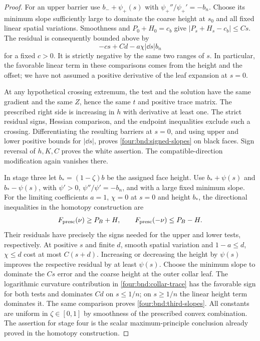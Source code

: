 \begin{proof}
For an upper barrier use $b_-+\psi_+(s)$ with
$\psi_+''/\psi_+'=-b_n$.  Choose its minimum slope sufficiently
large to dominate the coarse height at $s_0$ and all fixed linear
spatial variations.  Smoothness and $P_0+H_0=c_b$ give
$|P_s+H_s-c_b|\le Cs$.  The residual is consequently bounded above
by
\begin{equation}\label{four:bnd:upper-residual}
 -c s+Cd-a\chi|\dd s|b_n
\end{equation}
for a fixed $c>0$.  It is strictly negative by the same two ranges
of $s$.  In particular, the favorable linear term in these
comparisons comes from the height and the offset; we have not
assumed a positive derivative of the leaf expansion at $s=0$.

At any hypothetical crossing extremum, the test and the solution
have the same gradient and the same $Z$, hence the same $t$ and
positive trace matrix.  The prescribed right side is increasing
in $h$ with derivative at least one.  The strict residual signs,
Hessian comparison, and the endpoint inequalities exclude such
a crossing.  Differentiating the resulting barriers at $s=0$,
and using upper and lower positive bounds for $|\dd s|$, proves
\eqref{four:bnd:signed-slopes} on black faces.  Sign reversal of
$h,K,C$ proves the white assertion.  The compatible-direction
modification again vanishes there.

In stage three let $b_*=(1-\zeta)b$ be the assigned face height.
Use $b_*+\psi(s)$ and $b_*-\psi(s)$, with $\psi'>0$,
$\psi''/\psi'=-b_n$, and with a large fixed minimum slope.
For the limiting coefficients $a=1$, $\chi=0$ at $s=0$ and
height $b_*$, the directional
inequalities in the homotopy construction are
\[
 F_{\rm presc}(\nu)\ge P_B+H,\qquad
 F_{\rm presc}(-\nu)\le P_B-H.
\]
Their residuals have precisely the signs needed for the upper and
lower tests, respectively.  At positive $s$ and finite $d$, smooth
spatial variation and $1-a\le d$, $\chi\le d$ cost at most
$C(s+d)$.  Increasing or decreasing the height by $\psi(s)$
improves the respective residual by at least $\psi(s)$.  Choose
the minimum slope to dominate the $Cs$ error and the coarse height
at the outer collar leaf.  The logarithmic curvature contribution
in \eqref{four:bnd:collar-trace} has the favorable sign for both tests
and dominates $Cd$ on $s\le1/n$; on $s\ge1/n$ the linear height
term dominates it.  The same comparison proves
\eqref{four:bnd:third-slopes}.  All constants are uniform in
$\zeta\in[0,1]$ by smoothness of the prescribed convex combination.
The assertion for stage four is the scalar maximum-principle
conclusion already proved in the homotopy construction.
\end{proof}

